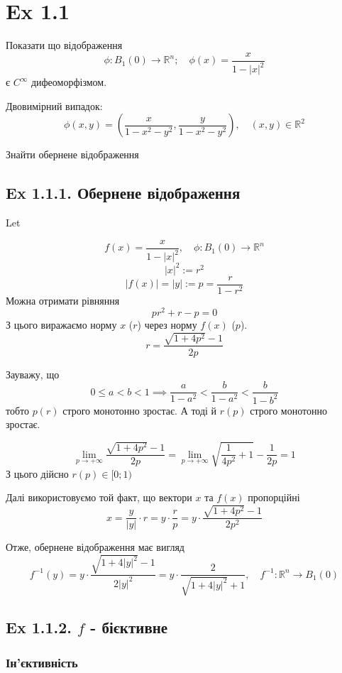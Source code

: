 \documentclass[10pt, a4paper]{article} %
\newcommand{\R}{\mathbb{R}}
\begin{document}
\section*{Ex 1.1}
\begin{mdframed}
    Показати що відображення 
    \[\phi: B_1(0) \to \R^n; \quad \phi(x)=\frac{x}{1-|x|^2}\]
    є $C^\infty$ дифеоморфізмом.

    Двовимірний випадок:
    \[\phi(x,y) = \left(\frac{x}{1-x^2-y^2}, \frac{y}{1-x^2-y^2}\right), \quad (x,y)\in\R^2\]

    Знайти обернене відображення
\end{mdframed}

\subsection*{Ex 1.1.1. Обернене відображення}

Let 

\[f(x) = \frac{x}{1-|x|^2}, \quad \phi : B_{1}(0) \to \R^n\]
\[|x|^2 := r^2\]
\[|f(x)| = |y| := p = \frac{r}{1-r^2}\]
Можна отримати рівняння
\[pr^2+r-p=0\]
З цього виражаємо норму $x$ ($r$) через норму $f(x)$ ($p$).
\[r = \frac{\sqrt{1+4p^2}-1}{2p}\]

Зауважу, що
\[0\le a<b <1 \implies \frac{a}{1-a^2} < \frac{b}{1-a^2} <\frac{b}{1-b^2}\]
тобто $p(r)$ строго монотонно зростає. А тоді й $r(p)$ строго монотонно зростає.

\[\lim_{p \to +\infty} \frac{\sqrt{1+4p^2}-1}{2p} = \lim_{p \to +\infty} \sqrt{\frac{1}{4p^2}+1}-\frac{1}{2p} = 1\]
З цього дійсно $r(p) \in [0;1)$

Далі використовуємо той факт, що вектори $x$ та $f(x)$ пропорційні
\[x = \frac{y}{|y|}\cdot r = y \cdot \frac{r}{p} = y \cdot \frac{\sqrt{1+4p^2}-1}{2p^2}\]

\begin{mdframed}[backgroundcolor=green!20]
    Отже, обернене відображення має вигляд
    \[f^{-1}(y) = y \cdot \frac{\sqrt{1+4|y|^2}-1}{2|y|^2} = y \cdot \frac{2}{\sqrt{1+4|y|^2}+1}, \quad f^{-1} : \R^n \to B_1(0)\]
\end{mdframed}

\subsection*{Ex 1.1.2. $f$ - бієктивне}
\subsubsection*{Ін'єктивність}
\end{document}
